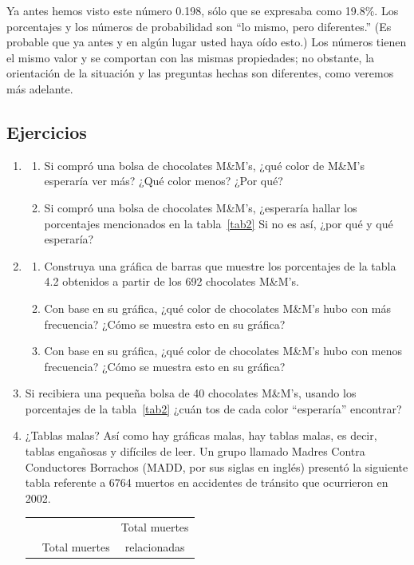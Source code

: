 \documentclass[10pt,twoside]{article}
\begin{document}
Ya antes hemos visto este número 0.198, sólo que se expresaba como 19.8\%.
Los porcentajes y los números de probabilidad son “lo mismo, pero diferentes.” (Es
probable que ya antes y en algún lugar usted haya oído esto.) Los números tienen
el mismo valor y se comportan con las mismas propiedades; no obstante, la orientación de la situación y las preguntas hechas son diferentes, como veremos más adelante.
\subsection*{Ejercicios}
\begin{enumerate}
\item 
\begin{enumerate}
\item Si compró una bolsa de chocolates M\&M’s, ¿qué color de M\&M’s esperaría ver más? ¿Qué color menos? ¿Por qué? 
\item Si compró una bolsa de chocolates M\&M’s, ¿esperaría hallar los porcentajes mencionados en la tabla~\ref{tab2} Si no es así, ¿por qué y qué esperaría? 
\end{enumerate}
\item
\begin{enumerate}
\item Construya una gráfica de barras que muestre los porcentajes de la tabla 4.2 obtenidos a
partir de los 692 chocolates M\&M’s.
\item Con base en su gráfica, ¿qué color de chocolates M\&M’s hubo con más frecuencia?
¿Cómo se muestra esto en su gráfica?
\item Con base en su gráfica, ¿qué color de chocolates M\&M’s hubo con menos frecuencia?
¿Cómo se muestra esto en su gráfica?
\end{enumerate}
\item Si recibiera una pequeña bolsa de 40 chocolates M\&M’s, usando los porcentajes de la tabla~\ref{tab2} ¿cuán   tos de cada color “esperaría” encontrar?
\item ¿Tablas malas? Así como hay gráficas malas, hay tablas malas, es decir, tablas engañosas y difíciles de leer. Un grupo llamado  Madres Contra Conductores Borrachos (MADD, por sus siglas en inglés) presentó la siguiente tabla referente a 6764 muertos en accidentes de tránsito que ocurrieron en 2002.
\begin{center}
\begin{tabular}{ccc}
 &  & Total muertes \\ 
 & Total muertes & relacionadas \\ 

\end{tabular}
\end{center}
\end{enumerate}
\end{document}
